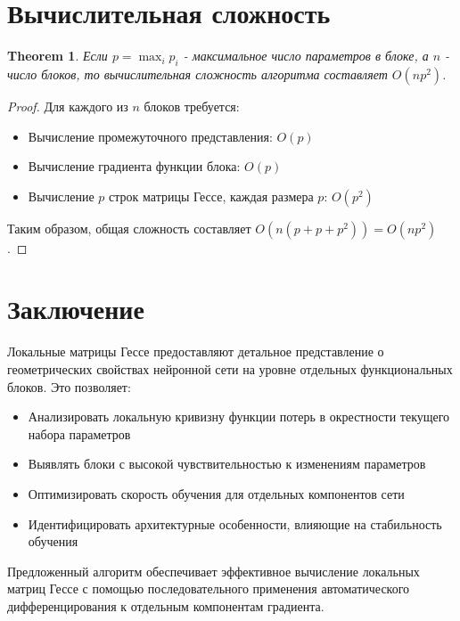 \documentclass[12pt]{article}
\newtheorem{theorem}{Theorem}
\begin{document}
\section{Вычислительная сложность}

\begin{theorem}
Если $p = \max_{i} p_i$ - максимальное число параметров в блоке, а $n$ - число блоков, то вычислительная сложность алгоритма составляет $O(np^2)$.
\end{theorem}

\begin{proof}
Для каждого из $n$ блоков требуется:
\begin{itemize}
\item Вычисление промежуточного представления: $O(p)$
\item Вычисление градиента функции блока: $O(p)$
\item Вычисление $p$ строк матрицы Гессе, каждая размера $p$: $O(p^2)$
\end{itemize}
Таким образом, общая сложность составляет $O(n(p + p + p^2)) = O(np^2)$.
\end{proof}

\section{Заключение}

Локальные матрицы Гессе предоставляют детальное представление о геометрических свойствах нейронной сети на уровне отдельных функциональных блоков. Это позволяет:

\begin{itemize}
\item Анализировать локальную кривизну функции потерь в окрестности текущего набора параметров
\item Выявлять блоки с высокой чувствительностью к изменениям параметров
\item Оптимизировать скорость обучения для отдельных компонентов сети
\item Идентифицировать архитектурные особенности, влияющие на стабильность обучения
\end{itemize}

Предложенный алгоритм обеспечивает эффективное вычисление локальных матриц Гессе с помощью последовательного применения автоматического дифференцирования к отдельным компонентам градиента.
\end{document}
